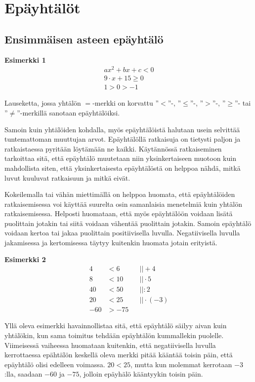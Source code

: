 \chapter{Epäyhtälöt}

\section{Ensimmäisen asteen epäyhtälö}

\textbf{Esimerkki 1}
\begin{align*}
ax^2+bx+c<0 \\
9 \cdot x+15\geq 0 \\
1>0>-1
\end{align*}

Lauseketta, jossa yhtälön $=$-merkki on korvattu
''$<$''-, ''$\leq$''-, ''$>$''-, ''$\geq$''- tai ''$\neq$''-merkillä sanotaan epäyhtälöiksi.

Samoin kuin yhtälöiden kohdalla, myös epäyhtälöistä halutaan usein selvittää
tuntemattoman muuttujan arvot. Epäyhtälöllä ratkaisuja on tietysti paljon ja ratkaistaessa
pyritään löytämään ne kaikki. Käytännössä ratkaiseminen tarkoittaa sitä, että epäyhtälö
muutetaan niin yksinkertaiseen muotoon kuin mahdollista siten, että yksinkertaisesta epäyhtälöstä
on helppoa nähdä, mitkä luvut kuuluvat ratkaisuun ja mitkä eivät.

Kokeilemalla tai vähän miettimällä on helppoa huomata, että epäyhtälöiden ratkaisemisessa
voi käyttää suurelta osin samanlaisia menetelmiä kuin yhtälön ratkaisemisessa. Helposti huomataan,
että myös epäyhtälöön voidaan lisätä puolittain jotakin tai siitä voidaan vähentää puolittain jotakin.
Samoin epäyhtälö voidaan kertoa tai jakaa puolittain positiivisella luvulla. Negatiivisella luvulla
jakamisessa ja kertomisessa täytyy kuitenkin huomata jotain erityistä.

\textbf{Esimerkki 2}
\begin{align*}
4&<6  \ \ \ \ \ &&|| +4 \\
8&<10 &&|| \cdot 5 \\
40&<50 &&|| :2 \\
20&<25 &&|| \cdot (-3) \\
-60&>-75
\end{align*}

Yllä oleva esimerkki havainnollistaa sitä, että epäyhtälö säilyy aivan kuin yhtälökin, kun sama toimitus tehdään
epäyhtälön kummallekin puolelle. Viimeisessä vaiheessa huomataan kuitenkin, että negatiivisella luvulla kerrottaessa
epähtälön keskellä oleva merkki pitää kääntää toisin päin, että epäyhtälö olisi edelleen voimassa. $20<25$, mutta kun molemmat
kerrotaan $-3$:lla, saadaan $-60$ ja $-75$, jolloin epäyhälö kääntyykin toisin päin.

